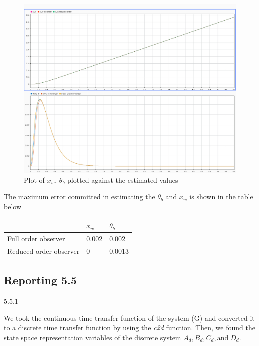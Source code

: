 \documentclass[11pt]{article}
\begin{document}
\begin{par}
\begin{figure}[ht]
	\centering
	\includegraphics[width=0.7\linewidth]{Images/cts_obs_ctlr.png}
	\caption{Plot of $x_w$, $\theta_b$ plotted against the estimated values}
	\label{fig:plot3}
\end{figure}



The maximum error committed in estimating the $\theta_b$ and $x_w$ is shown in the table below


\begin{center}
\begin{tabular}{ | m{5em} | m{3cm}| m{3cm} | } 
\hline
  & $x_w$ & $\theta_b$ \\ 
\hline
Full  order observer & 0.002 & 0.002 \\ 
\hline
Reduced order observer & 0 & 0.0013 \\ 
\hline
\end{tabular}
\end{center}


\end{par}



\subsection*{Reporting 5.5}


\begin{par}
	\begin{flushleft}
		5.5.1 
	\end{flushleft}
\end{par}

\begin{par}
	\begin{flushleft}
		We took the continuous time transfer function of the system (G) and converted it to a discrete time transfer function by using the \textit{c2d} function. Then, we found the state space representation variables of the discrete system $A_d ,B_d ,C_d ,\mathrm{and}\;D_d$.
	\end{flushleft}
\end{par}
\end{document}
